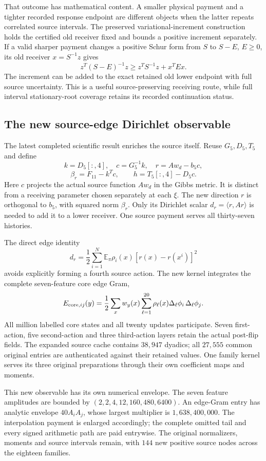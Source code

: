 That outcome has mathematical content. A smaller physical payment and a tighter recorded response endpoint are different objects when the latter repeats correlated source intervals. The preserved variational-increment construction holds the certified old receiver fixed and bounds a positive increment separately. If a valid sharper payment changes a positive Schur form from $S$ to $S-E$, $E\geq0$, its old receiver $x=S^{-1}z$ gives
\[
 z^T(S-E)^{-1}z\geq z^TS^{-1}z+x^TEx.
\]
The increment can be added to the exact retained old lower endpoint with full source uncertainty. This is a useful source-preserving receiving route, while full interval stationary-root coverage retains its recorded continuation status. 

\subsection{The new source-edge Dirichlet observable}

The latest completed scientific result enriches the source itself. Reuse $G_5,D_5,T_5$ and define
\[
 k=D_5[:,4],\quad c=G_5^{-1}k,\quad
 r=Aw_d-b_5c,
\]
\[
 \beta_r=F_{11}-k^Tc,\qquad
 h=T_5[:,4]-D_5c.
\]
Here $c$ projects the actual source function $Aw_d$ in the Gibbs metric. It is distinct from a receiving parameter chosen separately at each $\xi$. The new direction $r$ is orthogonal to $b_5$, with squared norm $\beta_r$. Only its Dirichlet scalar $d_r=\langle r,Ar\rangle$ is needed to add it to a lower receiver. One source payment serves all thirty-seven histories. 

The direct edge identity
\[
 d_r=\frac12\sum_{i=1}^N\mathbb E_\pi
                 \rho_i(x)[r(x)-r(x^i)]^2
\]
avoids explicitly forming a fourth source action. The new kernel integrates the complete seven-feature core edge Gram,
\[
 E_{{\rm core},ij}(y)=\frac12\sum_xw_y(x)
          \sum_{\ell=1}^{20}\rho_\ell(x)
              \Delta_\ell\phi_i\,\Delta_\ell\phi_j.
\]
All million labelled core states and all twenty updates participate. Seven first-action, five second-action and three third-action layers retain the actual post-flip fields. The expanded source cache contains $38{,}947$ dyadics; all $27{,}555$ common original entries are authenticated against their retained values. One family kernel serves its three original preparations through their own coefficient maps and moments.

This new observable has its own numerical envelope. The seven feature amplitudes are bounded by $(2,2,4,12,160,480,6400)$. An edge-Gram entry has analytic envelope $40A_iA_j$, whose largest multiplier is $1{,}638{,}400{,}000$. The interpolation payment is enlarged accordingly; the complete omitted tail and every signed arithmetic path are paid entrywise. The original normalizers, moments and source intervals remain, with $144$ new positive source nodes across the eighteen families. 

